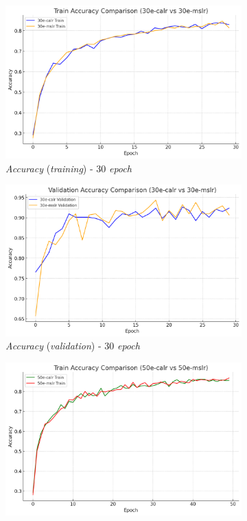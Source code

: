 \begin{figure}[htbp]
  \centering
  \begin{subfigure}{0.45\textwidth}
    \includegraphics[width=\textwidth]{gambar/bab4-train-acc-30e.png}
    \caption{\emph{Accuracy} (\emph{training}) - 30 \emph{epoch}}
  \end{subfigure}
  \hfill
  \begin{subfigure}{0.45\textwidth}
    \includegraphics[width=\textwidth]{gambar/bab4-val-acc-30e.png}
    \caption{\emph{Accuracy} (\emph{validation}) - 30 \emph{epoch}}
  \end{subfigure}
  \begin{subfigure}{0.45\textwidth}
    \includegraphics[width=\textwidth]{gambar/bab4-train-acc-50e.png}

\end{subfigure}
\end{figure}
